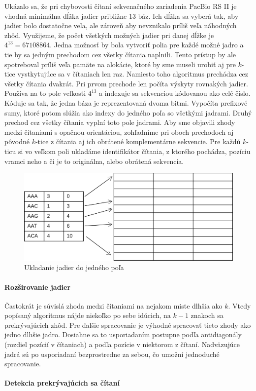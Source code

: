 Ukázalo sa, že pri chybovosti čítaní sekvenačného zariadenia PacBio RS II je vhodná minimálna dĺžka jadier približne 13 báz. Ich dĺžka sa vyberá tak, aby jadier bolo dostatočne veľa, ale zároveň aby nevznikalo príliš veľa náhodných zhôd. Využijeme, že počet všetkých možných jadier pri danej dĺžke je $4^{13} = 67108864$. Jedna možnosť by bola vytvoriť polia pre každé možné jadro a tie by sa jedným prechodom cez všetky čítania naplnili. Tento prístup by ale spotreboval príliš veľa pamäte na alokácie, ktoré by sme museli urobiť aj pre $k$-tice vystkytujúce sa v čítaniach len raz. Namiesto toho algoritmus prechádza cez všetky čítania dvakrát. Pri prvom prechode len počíta výskyty rovnakých jadier. Používa na to pole veľkosti $4^{13}$ a indexuje sa sekvenciou kódovanou ako celé číslo. Kóduje sa tak, že jedna báza je reprezentovaná dvoma bitmi. Vypočíta prefixové sumy, ktoré potom slúžia ako indexy do jedného poľa so všetkými jadrami. Druhý prechod cez všetky čítania vyplní toto pole jadrami. Aby sme objavili zhody medzi čítaniami s opačnou orientáciou, zohľadníme pri oboch prechodoch aj pôvodné $k$-tice z čítania aj ich obrátené komplementárne sekvencie. Pre každú $k$-ticu si vo veľkom poli ukladáme identifikátor čítania, z ktorého pochádza, pozíciu vramci neho a či je to originálna, alebo obrátená sekvencia. 

\begin{figure}
    \centering
    \includegraphics[width=1\textwidth]{images/jadra_velke_pole.png}
    \caption{Ukladanie jadier do jedného poľa}
    \label{fig:velke_pole}
\end{figure} 

\paragraph{Rozširovanie jadier}

Častokrát je súvislá zhoda medzi čítaniami na nejakom miste dlhšia ako $k$. Vtedy popísaný algoritmus nájde niekoľko po sebe idúcich, na $k - 1$ znakoch sa prekrývajúcich zhôd. Pre ďalšie spracovanie je výhodné spracovať tieto zhody ako jedno dlhšie jadro. Dosiahne sa to usporiadaním postupne podľa antidiagonály (rozdiel pozícií v čítaniach) a podľa pozície v niektorom z čítaní. Nadväzujúce jadrá sú po usporiadaní bezprostredne za sebou, čo umožní jednoduché spracovanie.

\paragraph{Detekcia prekrývajúcich sa čítaní}

